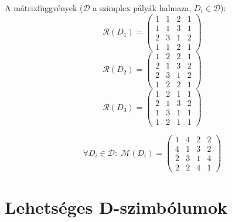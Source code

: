 \begin{frame}
  A mátrixfüggvények ($\mathcal{D}$ a szimplex pályák halmaza,
  $D_i\in\mathcal{D}$):
  \begin{equation*}
    \mathcal{R}(D_1)=
    \left(
    \begin{array}{cccc}
      1 & 1 & 2 & 1\\
      1 & 1 & 3 & 1\\
      2 & 3 & 1 & 2\\
      1 & 1 & 2 & 1
    \end{array}
    \right)
  \end{equation*}
  \begin{equation*}
    \mathcal{R}(D_2)=
    \left(
    \begin{array}{cccc}
      1 & 2 & 2 & 1\\
      2 & 1 & 3 & 2\\
      2 & 3 & 1 & 2\\
      1 & 2 & 2 & 1
    \end{array}
    \right)
  \end{equation*}
  \begin{equation*}
    \mathcal{R}(D_3)=
    \left(
    \begin{array}{cccc}
      1 & 2 & 1 & 1\\
      2 & 1 & 3 & 2\\
      1 & 3 & 1 & 1\\
      1 & 2 & 1 & 1
    \end{array}
    \right)
  \end{equation*}

  \begin{equation*}
    \forall D_i\in\mathcal{D}:\;
    \mathcal{M}(D_i)=
    \left(
    \begin{array}{cccc}
      1 & 4 & 2 & 2\\
      4 & 1 & 3 & 2\\
      2 & 3 & 1 & 4\\
      2 & 2 & 4 & 1
    \end{array}
    \right)
  \end{equation*}
\end{frame}

\section{Lehetséges D-szimbólumok}
